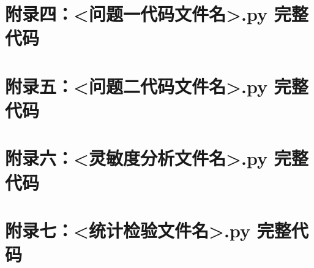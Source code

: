 \documentclass[12pt,a4paper]{ctexart}
\begin{document}
\section*{附录四：<问题一代码文件名>.py 完整代码}

\section*{附录五：<问题二代码文件名>.py 完整代码}

\section*{附录六：<灵敏度分析文件名>.py 完整代码}

\section*{附录七：<统计检验文件名>.py 完整代码}
\end{document}
